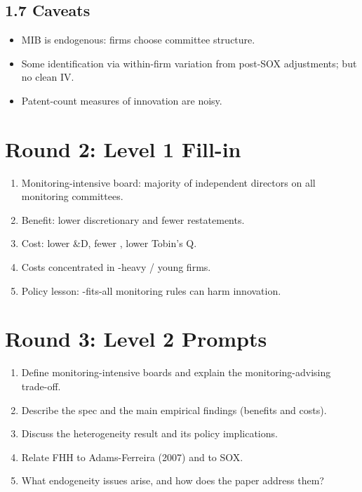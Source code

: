 \documentclass[11pt]{article}
\newcommand{\blank}[1]{\underline{\hspace{#1}}}
\begin{document}
\subsection*{1.7 Caveats}
\begin{alertbox}
\begin{itemize}
\item MIB is endogenous: firms choose committee structure.
\item Some identification via within-firm variation from post-SOX adjustments; but no clean IV.
\item Patent-count measures of innovation are noisy.
\end{itemize}
\end{alertbox}

\section*{Round 2: Level 1 Fill-in}
\begin{enumerate}
\item Monitoring-intensive board: majority of independent directors on all \blank{1cm} monitoring committees.
\item Benefit: lower discretionary \blank{2cm} and fewer restatements.
\item Cost: lower \blank{1cm}\&D, fewer \blank{2cm}, lower Tobin's Q.
\item Costs concentrated in \blank{2cm}-heavy / young firms.
\item Policy lesson: \blank{2cm}-fits-all monitoring rules can harm innovation.
\end{enumerate}

\section*{Round 3: Level 2 Prompts}
\begin{enumerate}
\item Define monitoring-intensive boards and explain the monitoring-advising trade-off.
\item Describe the spec and the main empirical findings (benefits and costs).
\item Discuss the heterogeneity result and its policy implications.
\item Relate FHH to Adams-Ferreira (2007) and to SOX.
\item What endogeneity issues arise, and how does the paper address them?
\end{enumerate}
\end{document}
